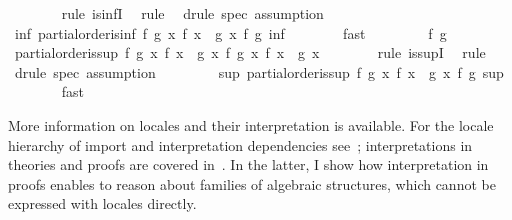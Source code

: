 \begin{isabellebody}
\ \ \ \ \ \ \isamarkupfalse%
\ {\isacharparenleft}rule\ is{\isacharunderscore}infI{\isacharparenright}\ \isamarkupfalse%
\ rule{\isacharplus}\ \isamarkupfalse%
\ {\isacharparenleft}drule\ spec{\isacharcomma}\ assumption{\isacharparenright}{\isacharplus}\ \isamarkupfalse%
\isanewline
\ \ \ \ \isamarkupfalse%
\ \isamarkupfalse%
\ {\isachardoublequoteopen}{\isasymexists}inf{\isachardot}\ partial{\isacharunderscore}order{\isachardot}is{\isacharunderscore}inf\ {\isacharparenleft}{\isasymlambda}f\ g{\isachardot}\ {\isasymforall}x{\isachardot}\ f\ x\ {\isasymsqsubseteq}\ g\ x{\isacharparenright}\ f\ g\ inf{\isachardoublequoteclose}\isanewline
\ \ \ \ \ \ \isamarkupfalse%
\ fast\isanewline
\ \ \isamarkupfalse%
\isanewline
\ \ \ \ \isamarkupfalse%
\ f\ g\isanewline
\ \ \ \ \isamarkupfalse%
\ {\isachardoublequoteopen}partial{\isacharunderscore}order{\isachardot}is{\isacharunderscore}sup\ {\isacharparenleft}{\isasymlambda}f\ g{\isachardot}\ {\isasymforall}x{\isachardot}\ f\ x\ {\isasymsqsubseteq}\ g\ x{\isacharparenright}\ f\ g\ {\isacharparenleft}{\isasymlambda}x{\isachardot}\ f\ x\ {\isasymsqunion}\ g\ x{\isacharparenright}{\isachardoublequoteclose}\isanewline
\ \ \ \ \ \ \isamarkupfalse%
\ {\isacharparenleft}rule\ is{\isacharunderscore}supI{\isacharparenright}\ \isamarkupfalse%
\ rule{\isacharplus}\ \isamarkupfalse%
\ {\isacharparenleft}drule\ spec{\isacharcomma}\ assumption{\isacharparenright}{\isacharplus}\ \isamarkupfalse%
\isanewline
\ \ \ \ \isamarkupfalse%
\ \isamarkupfalse%
\ {\isachardoublequoteopen}{\isasymexists}sup{\isachardot}\ partial{\isacharunderscore}order{\isachardot}is{\isacharunderscore}sup\ {\isacharparenleft}{\isasymlambda}f\ g{\isachardot}\ {\isasymforall}x{\isachardot}\ f\ x\ {\isasymsqsubseteq}\ g\ x{\isacharparenright}\ f\ g\ sup{\isachardoublequoteclose}\isanewline
\ \ \ \ \ \ \isamarkupfalse%
\ fast\isanewline
\ \ \isamarkupfalse%
%
\endisatagproof
{\isafoldproof}%
%
\isadelimproof
%
\endisadelimproof
%
\isamarkuptrue%
%
\begin{isamarkuptext}%
More information on locales and their interpretation is
  available.  For the locale hierarchy of import and interpretation
  dependencies see~\cite{Ballarin2006a}; interpretations in theories
  and proofs are covered in~\cite{Ballarin2006b}.  In the latter, I
  show how interpretation in proofs enables to reason about families
  of algebraic structures, which cannot be expressed with locales
  directly.


\end{isamarkuptext}
\end{isabellebody}
